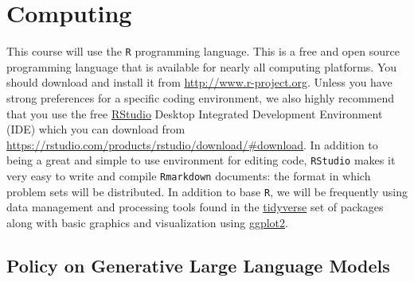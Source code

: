 \documentclass[11pt, article, oneside]{memoir}
\theoremstyle{Assumption}
\begin{document}
\section*{Computing}

This course will use the \texttt{R} programming language. This is a free and open source programming language that is available for nearly all computing platforms. You should download and install it from \url{http://www.r-project.org}. Unless you have strong preferences for a specific coding environment, we also highly recommend that you use the free \href{https://rstudio.com}{RStudio} Desktop Integrated Development Environment (IDE) which you can download from \url{https://rstudio.com/products/rstudio/download/#download}. In addition to being a great and simple to use environment for editing code, \texttt{RStudio} makes it very easy to write and compile \texttt{Rmarkdown} documents: the format in which problem sets will be distributed. In addition to base \texttt{R}, we will be frequently using data management and processing tools found in the \href{https://www.tidyverse.org/}{tidyverse} set of packages along with basic graphics and visualization using \href{https://ggplot2.tidyverse.org/}{ggplot2}. 

\subsection*{Policy on Generative Large Language Models}
\end{document}
